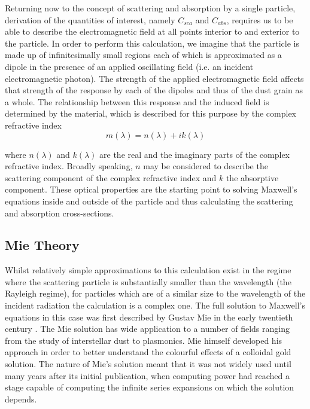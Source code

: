 Returning now to the concept of scattering and absorption by a single particle, derivation of the quantities of interest, namely $C_{sca}$ and $C_{abs}$, requires us to be able to describe the electromagnetic field at all points interior to and exterior to the particle.  In order to perform this calculation, we imagine that the particle is made up of infinitesimally small regions each of which is approximated as a dipole in the presence of an applied oscillating field (i.e. an incident electromagnetic photon).  The strength of the applied electromagnetic field affects that strength of the response by each of the dipoles and thus of the dust grain as a whole.  The relationship between this response and the induced field is determined by the material, which is described for this purpose by the complex refractive index 
\begin{equation}
m(\lambda)=n(\lambda)+ik(\lambda)
\end{equation}

\noindent where $n(\lambda)$ and $k(\lambda)$ are the real and the imaginary parts of the complex refractive index.  Broadly speaking, $n$ may be considered to describe the scattering component of the complex refractive index and $k$ the absorptive component.  These optical properties are the starting point to solving Maxwell's equations inside and outside of the particle and thus calculating the scattering and absorption cross-sections.

\subsection{Mie Theory}
\label{scn:mie_theory}

Whilst relatively simple approximations to this calculation exist in the regime where the scattering particle is substantially smaller than the wavelength (the Rayleigh regime), for particles which are of a similar size to the wavelength of the incident radiation the calculation is a complex one.  The full solution to Maxwell's equations in this case was first described by Gustav Mie in the early twentieth century \citep{Mie1908}.  The Mie solution has wide application to a number of fields ranging from the study of interstellar dust to plasmonics.  Mie himself developed his approach in order to better understand the colourful effects of a colloidal gold solution.  The nature of Mie's solution meant that it was not widely used until many years after its initial publication, when computing power had reached a stage capable of computing the infinite series expansions on which the solution depends.

